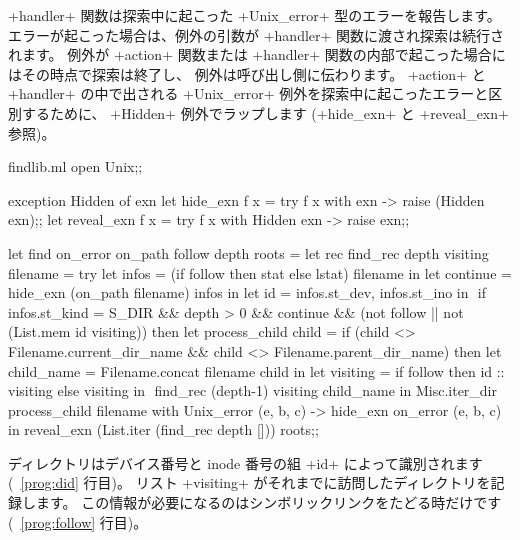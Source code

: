\ml+handler+ 関数は探索中に起こった \ml+Unix_error+ 型のエラーを報告します。
エラーが起こった場合は、例外の引数が \ml+handler+ 関数に渡され探索は続行されます。
例外が \ml+action+ 関数または \ml+handler+ 関数の内部で起こった場合にはその時点で探索は終了し、
例外は呼び出し側に伝わります。
\ml+action+ と \ml+handler+ の中で出される \ml+Unix_error+ 例外を探索中に起こったエラーと区別するために、
\ml+Hidden+ 例外でラップします
(\ml+hide_exn+ と \ml+reveal_exn+ 参照)。
%
\begin{listingcodefile}[style=numbers]{findlib.ml}
open Unix;;

exception Hidden of exn
let hide_exn f x = try f x with exn -> raise (Hidden exn);;
let reveal_exn f x = try f x with Hidden exn -> raise exn;;

let find on_error on_path follow depth roots =
  let rec find_rec depth visiting filename =
    try
      let infos = (if follow then stat else lstat) filename in
      let continue = hide_exn (on_path filename) infos in
      let id = infos.st_dev, infos.st_ino in $\label{prog:did}$
      if infos.st_kind = S_DIR && depth > 0 && continue &&
        (not follow || not (List.mem id visiting))
      then
        let process_child child =
          if (child <> Filename.current_dir_name &&
              child <> Filename.parent_dir_name) then
            let child_name = Filename.concat filename child in
            let visiting =
              if follow then id :: visiting else visiting in $\label{prog:follow}$
            find_rec (depth-1) visiting child_name in
        Misc.iter_dir process_child filename
    with Unix_error (e, b, c) -> hide_exn on_error (e, b, c) in
  reveal_exn (List.iter (find_rec depth [])) roots;;
\end{listingcodefile}

ディレクトリはデバイス番号と inode 番号の組 \ml+id+ によって識別されます (~\ref{prog:did} 行目)。
リスト \ml+visiting+ がそれまでに訪問したディレクトリを記録します。
この情報が必要になるのはシンボリックリンクをたどる時だけです (~\ref{prog:follow} 行目)。

